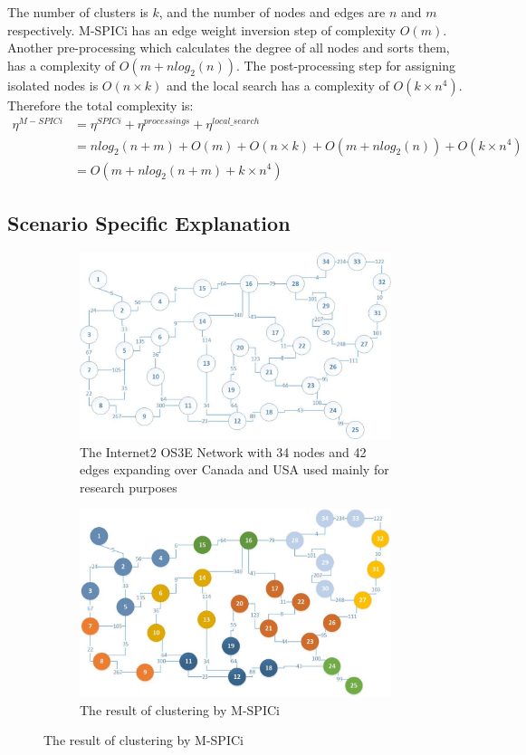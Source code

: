 \documentclass[times]{dacauth}
\begin{document}
\smallskip
The number of clusters is $k$, and the number of nodes and edges are $n$ and $m$ respectively. M-SPICi has an edge weight inversion step of complexity $O(m)$. Another pre-processing which calculates the degree of all nodes and sorts them, has a complexity of $O(m+nlog_2(n))$. The post-processing step for assigning isolated nodes is $O(n\times k)$ and the local search has a complexity of $O(k\times n^4)$. Therefore the total complexity is:
\begin{equation}
\begin{split}
\eta^{M-SPICi} &= \eta^{SPICi} + \eta^{processings} + \eta^{local\_search}\\
&= nlog_2(n+m)+O(m)+O(n\times k) + O(m+nlog_2(n))+O(k\times n^4)\\
&= O(m+nlog_2(n+m)+k\times n^4)
\end{split}
\end{equation}

\subsection{Scenario Specific Explanation}

\begin{figure}
	\centering
	\begin{subfigure}{.5\textwidth}
		\centering
		\includegraphics[width=.8\linewidth]{Figures/example.jpg}
		\caption{The Internet2 OS3E Network with 34 nodes and 42 edges expanding over Canada and USA used mainly for research purposes \cite{dbcp2017}}
		\label{fig:example}
	\end{subfigure}%
	\begin{subfigure}{.5\textwidth}
		\centering
		\includegraphics[width=.8\linewidth]{Figures/mspici.jpg}
		\caption{The result of clustering by M-SPICi}
		\label{fig:mspici}
	\end{subfigure}
\end{figure}
\end{document}
